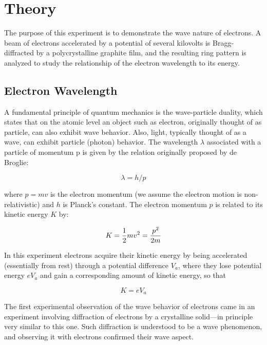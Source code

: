 \section{Theory}

The purpose of this experiment is to demonstrate the wave nature of electrons. A
beam of electrons accelerated by a potential of several kilovolts is
Bragg-diffracted by a polycrystalline graphite film, and the resulting ring
pattern is analyzed to study the relationship of the electron wavelength to its
energy.

\subsection{Electron Wavelength}

A fundamental principle of quantum mechanics is the wave-particle
duality, which states that on the atomic level an object such as
electron, originally thought of as particle, can also exhibit wave
behavior.  Also, light, typically thought of as a wave, can exhibit
particle (photon) behavior.  The wavelength $\lambda$ associated
with a particle of momentum p is given by the relation originally
proposed by de Broglie:

\begin{equation}
\lambda = h/p
\label{eq:debroglie}
\end{equation}

\noindent where $p = mv$ is the electron momentum (we assume the electron motion
is non-relativistic) and $h$ is Planck's constant.  The electron momentum $p$ is
related to its kinetic energy $K$ by:

\begin{equation}
K = {1 \over 2} mv^2 = {p^2 \over 2m}
\label{eq:ke}
\end{equation}

In this experiment electrons acquire their kinetic energy by being accelerated
(essentially from rest) through a potential difference $V_a$, where they lose
potential energy $eV_a$ and gain a corresponding amount of kinetic energy, so
that

\begin{equation}
K = eV_a
\label{eq:kev}
\end{equation}

The first experimental observation of the wave behavior of electrons came in an
experiment involving diffraction of electrons by a crystalline solid---in
principle very similar to this one. Such diffraction is understood to be a wave
phenomenon, and observing it with electrons confirmed their wave aspect.

